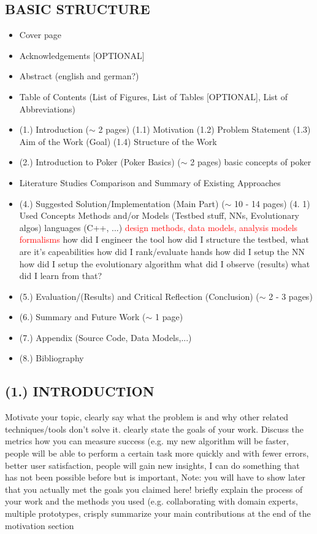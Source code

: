 \subsection{BASIC STRUCTURE}
\begin{itemize}
\item Cover page
\item Acknowledgements [OPTIONAL]
\item Abstract (english and german?)
\item Table of Contents (List of Figures, List of Tables [OPTIONAL], List of Abbreviations)
\item (1.) Introduction ($\sim$ 2 pages)
\subitem (1.1) Motivation
\subitem (1.2) Problem Statement
\subitem (1.3) Aim of the Work (Goal)
\subitem (1.4) Structure of the Work
\item (2.) Introduction to Poker (Poker Basics) ($\sim$ 2 pages)
\subitem basic concepts of poker
\subitem {}
\item {} 
\subitem Literature Studies
\subitem Comparison and Summary of Existing Approaches
\item (4.) Suggested Solution/Implementation (Main Part) ($\sim$ 10 - 14 pages)
\subitem (4. 1)
\subsubitem Used Concepts 
\subsubitem Methods and/or Models (Testbed stuff, NNs, Evolutionary algos)
\subsubitem languages (C++, ...)
\subsubitem \textcolor{red}{design methods, data models, analysis models}
\subsubitem \textcolor{red}{formalisms}
\subitem how did I engineer the tool
\subitem how did I structure the testbed, what are it's capeabilities
\subitem how did I rank/evaluate hands
\subitem how did I setup the NN
\subitem how did I setup the evolutionary algorithm
\subitem what did I observe (results)
\subitem what did I learn from that?
\item (5.) Evaluation/(Results) and Critical Reflection (Conclusion) ($\sim$ 2 - 3 pages)
\item (6.) Summary and Future Work ($\sim$ 1 page)
\item (7.) Appendix (Source Code, Data Models,...)
\item (8.) Bibliography
\end{itemize}
\pagebreak
\subsection{(1.) INTRODUCTION}
Motivate your topic, clearly say what the problem is and why other related techniques/tools don't solve it. clearly state the goals of your work. Discuss the metrics how you can measure success  (e.g. my new algorithm will be faster, people will be able to perform a certain task more quickly and with fewer errors, better user satisfaction, people will gain new insights, I can do something that has not been possible before but is important, Note: you will have to show later that you actually met the goals you claimed
here! briefly explain the process of your work and the methods you used (e.g.
collaborating with domain experts, multiple prototypes, crisply summarize your main contributions at the end of the motivation section
